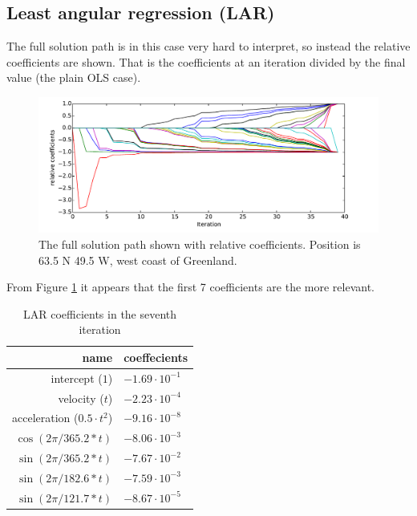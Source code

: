 \pagebreak
\subsection{Least angular regression (LAR)}

The full solution path is in this case very hard to interpret, so instead the relative coefficients are shown. That is the coefficients at an iteration divided by the final value (the plain OLS case).

\begin{figure}[H]
	\centering
	\includegraphics[width=\textwidth]{figures/lar-coefficients}
	\caption{The full solution path shown with relative coefficients. Position is 63.5 N 49.5 W, west coast of Greenland.}
	\label{fig:lar-coefficients}
\end{figure}

From Figure \ref{fig:lar-coefficients} it appears that the first 7 coefficients are the more relevant. 
\begin{table}[H]
\centering
\begin{tabular}{r|l}
name                 & coeffecients \\ \hline
intercept ($1$) & $-1.69 \cdot 10^{-1}$ \\
velocity ($t$) & $-2.23 \cdot 10^{-4}$ \\
acceleration ($0.5 \cdot t^2$) & $-9.16 \cdot 10^{-8}$ \\
$\cos(2 \pi /365.2 * t)$ & $-8.06 \cdot 10^{-3}$ \\
$\sin(2 \pi /365.2 * t)$ & $-7.67 \cdot 10^{-2}$ \\
$\sin(2 \pi /182.6 * t)$ & $-7.59 \cdot 10^{-3}$ \\
$\sin(2 \pi /121.7 * t)$ & $-8.67 \cdot 10^{-5}$
\end{tabular}
\caption{LAR coefficients in the seventh iteration}
\end{table}

